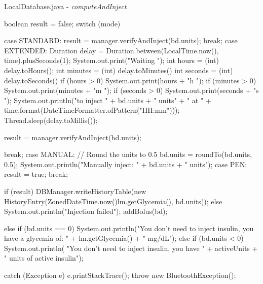 \begin{javaCode}{LocalDatabase.java - \textit{computeAndInject}}
{{        boolean result = false;
        switch (mode) {
            case STANDARD:
                result = manager.verifyAndInject(bd.units);
                break;
            case EXTENDED:
                Duration delay = Duration.between(LocalTime.now(), time).plusSeconds(1); System.out.print("Waiting ");
                int hours = (int) delay.toHours();
                int minutes = (int) delay.toMinutes() %
                int seconds = (int) delay.toSeconds() %
                if (hours > 0)
                    System.out.print(hours + "h ");
                if (minutes > 0)
                    System.out.print(minutes + "m ");
                if (seconds > 0)
                    System.out.print(seconds + "s ");
                System.out.println("to inject " + bd.units + " units" + " at " + time.format(DateTimeFormatter.ofPattern("HH:mm")));
                Thread.sleep(delay.toMillis());

                result = manager.verifyAndInject(bd.units);

                break;
            case MANUAL:
                // Round the units to 0.5
                bd.units = roundTo(bd.units, 0.5);
                System.out.println("Manually inject: " + bd.units + " units");
            case PEN:
                result = true;
                break;
        }
        if (result) {
            DBManager.writeHistoryTable(new HistoryEntry(ZonedDateTime.now()lm.getGlycemia(), bd.units));
        } else {
            System.out.println("Injection failed");
        }
        addBolus(bd);
    } else if (bd.units == 0) {
        System.out.println("You don't need to inject insulin, you have a glycemia of: " + lm.getGlycemia() + " mg/dL");
    } else if (bd.units < 0) {
        System.out.println( "You don't need to inject insulin, you have " + activeUnits + " units of active insulin");
    }
} catch (Exception e) {
    e.printStackTrace();
    throw new BluetoothException();
}
\end{javaCode}